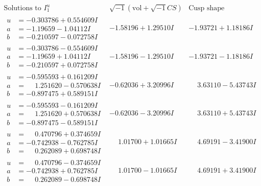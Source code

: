 \documentclass[1p]{elsarticle_modified}
\theoremstyle{definition}
\newcommand{\I}{\sqrt{-1}}
\begin{document}
$$\begin{array}{c|c|c}  
\text{Solutions to }I^u_{1}& \I (\text{vol} + \sqrt{-1}CS) & \text{Cusp shape}\\
 \hline 
\begin{aligned}
u &= -0.303786 + 0.554609 I \\
a &= -1.19659 - 1.04112 I \\
b &= -0.210597 - 0.072758 I\end{aligned}
 & -1.58196 + 1.29510 I & -1.93721 + 1.18186 I \\ \hline\begin{aligned}
u &= -0.303786 - 0.554609 I \\
a &= -1.19659 + 1.04112 I \\
b &= -0.210597 + 0.072758 I\end{aligned}
 & -1.58196 - 1.29510 I & -1.93721 - 1.18186 I \\ \hline\begin{aligned}
u &= -0.595593 + 0.161209 I \\
a &= \phantom{-}1.251620 - 0.570638 I \\
b &= -0.897475 + 0.589151 I\end{aligned}
 & -0.62036 + 3.20996 I & \phantom{-}3.63110 - 5.43743 I \\ \hline\begin{aligned}
u &= -0.595593 - 0.161209 I \\
a &= \phantom{-}1.251620 + 0.570638 I \\
b &= -0.897475 - 0.589151 I\end{aligned}
 & -0.62036 - 3.20996 I & \phantom{-}3.63110 + 5.43743 I \\ \hline\begin{aligned}
u &= \phantom{-}0.470796 + 0.374659 I \\
a &= -0.742938 - 0.762785 I \\
b &= \phantom{-}0.262089 + 0.698748 I\end{aligned}
 & \phantom{-}1.01700 + 1.01665 I & \phantom{-}4.69191 - 3.41900 I \\ \hline\begin{aligned}
u &= \phantom{-}0.470796 - 0.374659 I \\
a &= -0.742938 + 0.762785 I \\
b &= \phantom{-}0.262089 - 0.698748 I\end{aligned}
 & \phantom{-}1.01700 - 1.01665 I & \phantom{-}4.69191 + 3.41900 I \\ \hline\begin{aligned}

\end{aligned}
\end{array}$$
\end{document}
